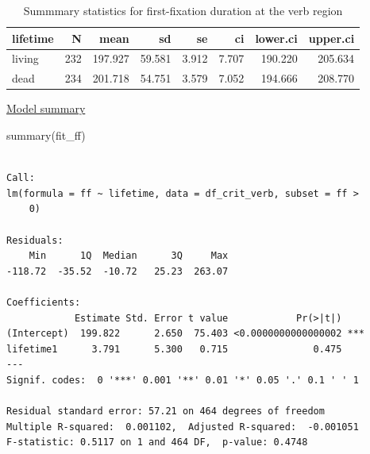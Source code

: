 \documentclass[
  letterpaper,
  DIV=11,
  numbers=noendperiod]{scrartcl}
\newenvironment{Shaded}{\begin{snugshade}}{\end{snugshade}}
\newcommand{\FunctionTok}[1]{\textcolor[rgb]{0.28,0.35,0.67}{#1}}
\newcommand{\NormalTok}[1]{\textcolor[rgb]{0.00,0.23,0.31}{#1}}
\begin{document}
\begin{table}

\caption{Summmary statistics for first-fixation duration at the verb region}
\fontsize{24}{26}\selectfont
\begin{tabular}[t]{l|r|r|r|r|r|r|r}
\hline
lifetime & N & mean & sd & se & ci & lower.ci & upper.ci\\
\hline
living & 232 & 197.927 & 59.581 & 3.912 & 7.707 & 190.220 & 205.634\\
\hline
dead & 234 & 201.718 & 54.751 & 3.579 & 7.052 & 194.666 & 208.770\\
\hline
\end{tabular}
\end{table}

\ul{Model summary}

\begin{Shaded}
\begin{Highlighting}[]
\FunctionTok{summary}\NormalTok{(fit\_ff)}
\end{Highlighting}
\end{Shaded}

\begin{verbatim}

Call:
lm(formula = ff ~ lifetime, data = df_crit_verb, subset = ff > 
    0)

Residuals:
    Min      1Q  Median      3Q     Max 
-118.72  -35.52  -10.72   25.23  263.07 

Coefficients:
            Estimate Std. Error t value            Pr(>|t|)    
(Intercept)  199.822      2.650  75.403 <0.0000000000000002 ***
lifetime1      3.791      5.300   0.715               0.475    
---
Signif. codes:  0 '***' 0.001 '**' 0.01 '*' 0.05 '.' 0.1 ' ' 1

Residual standard error: 57.21 on 464 degrees of freedom
Multiple R-squared:  0.001102,  Adjusted R-squared:  -0.001051 
F-statistic: 0.5117 on 1 and 464 DF,  p-value: 0.4748
\end{verbatim}

\hypertarget{section}{%
\subsection*{}\label{section}}
\end{document}
